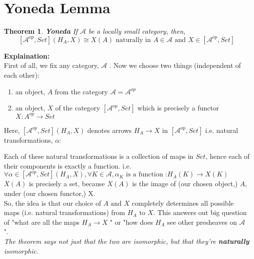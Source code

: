 \documentclass[18pt,a4paper]{extarticle}
\theoremstyle{theorem}
\newtheorem{theorem}{Theorem}[section]
\theoremstyle{definition}
\theoremstyle{lemma}
\begin{document}
\section{Yoneda Lemma} %


\begin{theorem}{\textbf{Yoneda}} %
	If $\mathcal{A} $ be a locally small category, then, \\
	\[ [ \mathcal{A} ^{op},Set ](H_A,X) \cong X(A) \text{ naturally in } A \in \mathcal{A} \text{ and }
	X \in [ \mathcal{A}^{op},Set]\]
\end{theorem}
\textbf{Explaination:} \\
First of all, we fix any category, $\mathcal{A} $ . Now we choose two things (independent of each other):
\begin{enumerate}[label=\roman*]
	\item an object, $A$ from the category $ \mathcal{A}= \mathcal{A} ^{op} $
	\item an object, $X$ of the category $[ \mathcal{A}^{op},Set] $
		which is precisely a functor $X: A^{op} \rightarrow Set$
\end{enumerate}
Here, $[ \mathcal{A}^{op},Set](	H_A,X) $ denotes arrows $H_A \rightarrow X$ in $[ \mathcal{A}^{op},Set] $
i.e. natural transformations, $\alpha :$
Each of these natural transformations is a collection of maps in $Set$, hence each of their
components is exactly a function. i.e.
$\forall \alpha \in [ \mathcal{A}^{op},Set](H_A,X), \forall K \in \mathcal{A}, \alpha_K \text{ is a function :} H_A(K) \to X(K)$\\

$X(A)$ is precisely a set, because $X(A)$ is the image of (our chosen object,) $A$, under (our chosen functor,) X. \\

So, the idea is that our choice of $A \text{ and } X$ completely determines all possible maps
(i.e. natural transformations) from $H_A \text{ to } X$. This answers out big question of "what are all the maps
$H_A  \rightarrow X$ " or "how does $H_A$ see other presheaves on $\mathcal{A} $ ".\\

\textit{The theorem says not just that the two are isomorphic, but that they're \textbf{naturally} isomorphic.}
\end{document}
